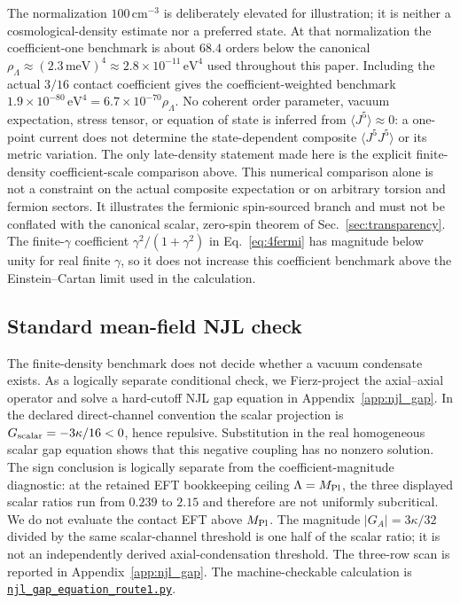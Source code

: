 \documentclass[aps,prd,twocolumn,superscriptaddress,showpacs,preprintnumbers,nofootinbib,longbibliography,floatfix]{revtex4-2}
\newcommand{\artifactnamed}[2]{\href{https://github.com/Hubify-Projects/bigbounce/blob/main/#1}{\nolinkurl{#2}}}
\begin{document}
The normalization $100\,\mathrm{cm}^{-3}$ is deliberately elevated for
illustration; it is neither a cosmological-density estimate nor a preferred
state.  At that normalization the coefficient-one benchmark is about $68.4$
orders below the canonical
$\rho_\Lambda\approx (2.3\,\text{meV})^4 \approx 2.8\times 10^{-11}\,\text{eV}^4$
used throughout this paper.  Including the actual $3/16$ contact coefficient
gives the coefficient-weighted benchmark
$1.9\times10^{-80}\,\text{eV}^4=6.7\times10^{-70}\rho_\Lambda$.
No coherent order parameter, vacuum expectation, stress tensor, or equation of
state is inferred from $\langle J^5\rangle\approx0$: a one-point current does
not determine the state-dependent composite $\langle J^5J^5\rangle$ or its
metric variation.  The only late-density statement made here is the explicit
finite-density coefficient-scale comparison above.
This numerical comparison alone is not a constraint on the actual composite
expectation or on arbitrary torsion and fermion sectors.  It illustrates the
fermionic spin-sourced branch and must not be conflated with the canonical
scalar, zero-spin theorem of Sec.~\ref{sec:transparency}.  The finite-$\gamma$ coefficient
$\gamma^2/(1+\gamma^2)$ in Eq.~\eqref{eq:4fermi} has magnitude below unity for
real finite $\gamma$, so it does not increase this coefficient benchmark above
the Einstein--Cartan limit used in the calculation.

\subsection{Standard mean-field NJL check}

The finite-density benchmark does not decide whether a vacuum condensate
exists.  As a logically separate conditional check, we Fierz-project the
axial--axial operator and solve a
hard-cutoff NJL gap equation in Appendix~\ref{app:njl_gap}.  In the declared
direct-channel convention the scalar projection is
$G_{\rm scalar}=-3\kappa/16<0$, hence repulsive.  Substitution in the real
homogeneous scalar gap equation shows that this negative coupling has no
nonzero solution.  The sign conclusion is logically separate from the
coefficient-magnitude diagnostic: at the retained EFT bookkeeping ceiling
$\Lambda=M_{\rm Pl}$, the three displayed scalar ratios run from $0.239$ to
$2.15$ and therefore are not uniformly subcritical.  We do not evaluate the
contact EFT above $M_{\rm Pl}$.  The magnitude $|G_A|=3\kappa/32$ divided by
the same scalar-channel threshold is one half of the scalar ratio; it is not
an independently derived axial-condensation threshold.  The three-row scan is
reported in Appendix~\ref{app:njl_gap}.
The machine-checkable calculation is
\artifactnamed{arxiv/scripts/njl_gap_equation_route1.py}{njl_gap_equation_route1.py}.
\end{document}
